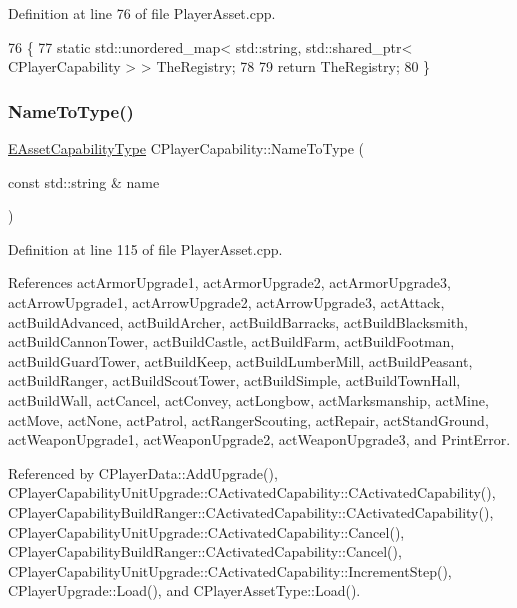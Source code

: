 Definition at line 76 of file Player\+Asset.\+cpp.


\begin{DoxyCode}
76                                                                                                   \{
77     \textcolor{keyword}{static} std::unordered\_map< std::string, std::shared\_ptr< CPlayerCapability > > TheRegistry;
78     
79     \textcolor{keywordflow}{return} TheRegistry;
80 \}
\end{DoxyCode}
\hypertarget{classCPlayerCapability_a920a696526e8a839f728192aea0ba1c5}{}\label{classCPlayerCapability_a920a696526e8a839f728192aea0ba1c5} 
\subsubsection{\texorpdfstring{Name\+To\+Type()}{NameToType()}}
{\footnotesize\ttfamily \hyperlink{GameDataTypes_8h_a35b98ce26aca678b03c6f9f76e4778ce}{E\+Asset\+Capability\+Type} C\+Player\+Capability\+::\+Name\+To\+Type (\begin{DoxyParamCaption}\item[{const std\+::string \&}]{name }\end{DoxyParamCaption})\hspace{0.3cm}{\ttfamily [static]}}



Definition at line 115 of file Player\+Asset.\+cpp.



References act\+Armor\+Upgrade1, act\+Armor\+Upgrade2, act\+Armor\+Upgrade3, act\+Arrow\+Upgrade1, act\+Arrow\+Upgrade2, act\+Arrow\+Upgrade3, act\+Attack, act\+Build\+Advanced, act\+Build\+Archer, act\+Build\+Barracks, act\+Build\+Blacksmith, act\+Build\+Cannon\+Tower, act\+Build\+Castle, act\+Build\+Farm, act\+Build\+Footman, act\+Build\+Guard\+Tower, act\+Build\+Keep, act\+Build\+Lumber\+Mill, act\+Build\+Peasant, act\+Build\+Ranger, act\+Build\+Scout\+Tower, act\+Build\+Simple, act\+Build\+Town\+Hall, act\+Build\+Wall, act\+Cancel, act\+Convey, act\+Longbow, act\+Marksmanship, act\+Mine, act\+Move, act\+None, act\+Patrol, act\+Ranger\+Scouting, act\+Repair, act\+Stand\+Ground, act\+Weapon\+Upgrade1, act\+Weapon\+Upgrade2, act\+Weapon\+Upgrade3, and Print\+Error.



Referenced by C\+Player\+Data\+::\+Add\+Upgrade(), C\+Player\+Capability\+Unit\+Upgrade\+::\+C\+Activated\+Capability\+::\+C\+Activated\+Capability(), C\+Player\+Capability\+Build\+Ranger\+::\+C\+Activated\+Capability\+::\+C\+Activated\+Capability(), C\+Player\+Capability\+Unit\+Upgrade\+::\+C\+Activated\+Capability\+::\+Cancel(), C\+Player\+Capability\+Build\+Ranger\+::\+C\+Activated\+Capability\+::\+Cancel(), C\+Player\+Capability\+Unit\+Upgrade\+::\+C\+Activated\+Capability\+::\+Increment\+Step(), C\+Player\+Upgrade\+::\+Load(), and C\+Player\+Asset\+Type\+::\+Load().


